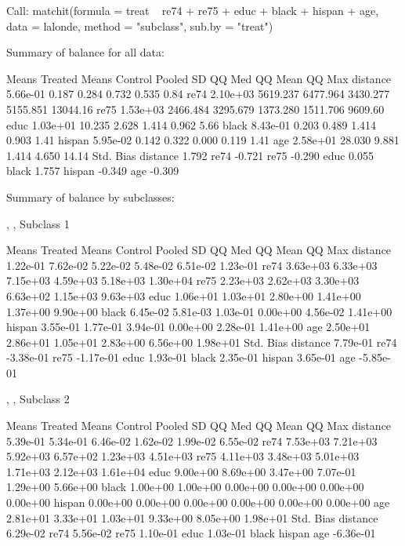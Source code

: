 \documentclass[oneside,letterpaper,titlepage]{article}
\begin{document}
\begin{enumerate}
\begin{Schunk}
\begin{Soutput}
Call:
matchit(formula = treat ~ re74 + re75 + educ + black + hispan +     age, data = lalonde, method = "subclass", sub.by = "treat")

Summary of balance for all data:

         Means Treated Means Control Pooled SD   QQ Med  QQ Mean   QQ Max
distance      5.66e-01         0.187     0.284    0.732    0.535     0.84
re74          2.10e+03      5619.237  6477.964 3430.277 5155.851 13044.16
re75          1.53e+03      2466.484  3295.679 1373.280 1511.706  9609.60
educ          1.03e+01        10.235     2.628    1.414    0.962     5.66
black         8.43e-01         0.203     0.489    1.414    0.903     1.41
hispan        5.95e-02         0.142     0.322    0.000    0.119     1.41
age           2.58e+01        28.030     9.881    1.414    4.650    14.14
         Std. Bias
distance     1.792
re74        -0.721
re75        -0.290
educ         0.055
black        1.757
hispan      -0.349
age         -0.309


Summary of balance by subclasses:

, , Subclass 1

         Means Treated Means Control Pooled SD    QQ Med   QQ Mean    QQ Max
distance      1.22e-01      7.62e-02  5.22e-02  5.48e-02  6.51e-02  1.23e-01
re74          3.63e+03      6.33e+03  7.15e+03  4.59e+03  5.18e+03  1.30e+04
re75          2.23e+03      2.62e+03  3.30e+03  6.63e+02  1.15e+03  9.63e+03
educ          1.06e+01      1.03e+01  2.80e+00  1.41e+00  1.37e+00  9.90e+00
black         6.45e-02      5.81e-03  1.03e-01  0.00e+00  4.56e-02  1.41e+00
hispan        3.55e-01      1.77e-01  3.94e-01  0.00e+00  2.28e-01  1.41e+00
age           2.50e+01      2.86e+01  1.05e+01  2.83e+00  6.56e+00  1.98e+01
         Std. Bias
distance  7.79e-01
re74     -3.38e-01
re75     -1.17e-01
educ      1.93e-01
black     2.35e-01
hispan    3.65e-01
age      -5.85e-01

, , Subclass 2

         Means Treated Means Control Pooled SD    QQ Med   QQ Mean    QQ Max
distance      5.39e-01      5.34e-01  6.46e-02  1.62e-02  1.99e-02  6.55e-02
re74          7.53e+03      7.21e+03  5.92e+03  6.57e+02  1.23e+03  4.51e+03
re75          4.11e+03      3.48e+03  5.01e+03  1.71e+03  2.12e+03  1.61e+04
educ          9.00e+00      8.69e+00  3.47e+00  7.07e-01  1.29e+00  5.66e+00
black         1.00e+00      1.00e+00  0.00e+00  0.00e+00  0.00e+00  0.00e+00
hispan        0.00e+00      0.00e+00  0.00e+00  0.00e+00  0.00e+00  0.00e+00
age           2.81e+01      3.33e+01  1.03e+01  9.33e+00  8.05e+00  1.98e+01
         Std. Bias
distance  6.29e-02
re74      5.56e-02
re75      1.10e-01
educ      1.03e-01
black             
hispan            
age      -6.36e-01


\end{Soutput}
\end{Schunk}
\end{enumerate}
\end{document}
